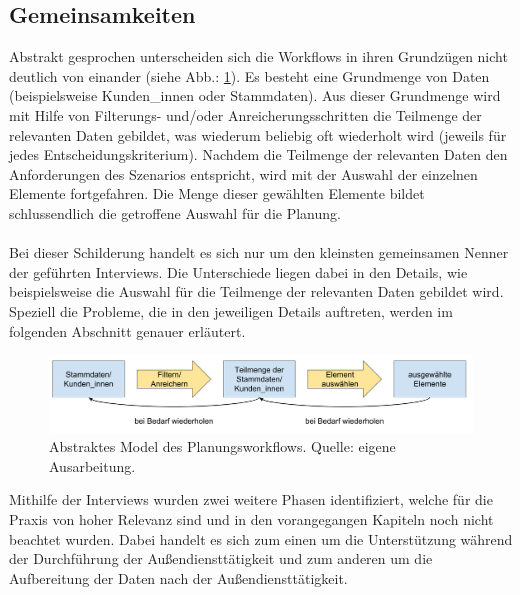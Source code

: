 \documentclass[Bachelorarbeit.tex]{subfiles}
\begin{document}
\subsection{Gemeinsamkeiten}
\label{subsubsec:Ergebnisse der Interviews:gemeinsamkeiten}
Abstrakt gesprochen unterscheiden sich die Workflows in ihren Grundzügen nicht deutlich von einander (siehe Abb.: \ref{fig:abstrakterWorkflowPlannung}). 
Es besteht eine Grundmenge von Daten (beispielsweise Kunden\_innen oder Stammdaten). 
Aus dieser Grundmenge wird mit Hilfe von Filterungs- und/oder Anreicherungsschritten die Teilmenge der relevanten Daten gebildet, was wiederum beliebig oft wiederholt wird (jeweils für jedes Entscheidungskriterium).
Nachdem die Teilmenge der relevanten Daten den Anforderungen des Szenarios entspricht, wird mit der Auswahl der einzelnen Elemente fortgefahren.
Die Menge dieser gewählten Elemente bildet schlussendlich die getroffene Auswahl für die Planung.\\
\\
Bei dieser Schilderung handelt es sich nur um den kleinsten gemeinsamen Nenner der geführten Interviews.
Die Unterschiede liegen dabei in den Details, wie beispielsweise die Auswahl für die Teilmenge der relevanten Daten gebildet wird.
Speziell die Probleme, die in den jeweiligen Details auftreten, werden im folgenden Abschnitt genauer erläutert.

\begin{figure}[h]
	\includegraphics[width=\linewidth]{img/analyse/abstrakterWorkflowPlannung}
	\caption[Abstrakter Planungsworkflow]{Abstraktes Model des Planungsworkflows. Quelle: eigene Ausarbeitung.}
	\label{fig:abstrakterWorkflowPlannung}
\end{figure}

Mithilfe der Interviews wurden zwei weitere Phasen identifiziert, welche für die Praxis von hoher Relevanz sind und in den vorangegangen Kapiteln noch nicht beachtet wurden.
Dabei handelt es sich zum einen um die Unterstützung während der Durchführung der Außendiensttätigkeit und zum anderen um die Aufbereitung der Daten nach der Außendiensttätigkeit.
\end{document}
